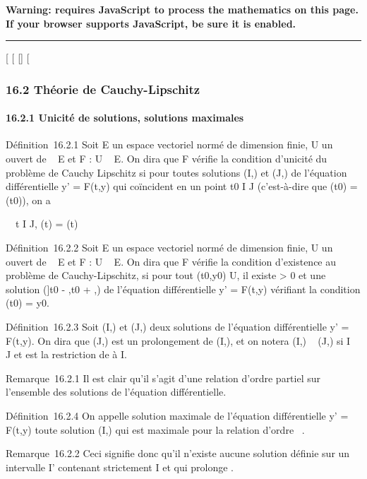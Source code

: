 \textbf{Warning: 
requires JavaScript to process the mathematics on this page.\\ If your
browser supports JavaScript, be sure it is enabled.}

\begin{center}\rule{3in}{0.4pt}\end{center}

{[}
{[}
{[}{]}
{[}

\subsubsection{16.2 Théorie de Cauchy-Lipschitz}

\paragraph{16.2.1 Unicité de solutions, solutions maximales}

Définition~16.2.1 Soit E un espace vectoriel normé de dimension finie, U
un ouvert de ~ \times E et F : U \rightarrow~ E. On dira que F vérifie la condition
d'unicité du problème de Cauchy Lipschitz si pour toutes solutions (I,\phi)
et (J,\psi) de l'équation différentielle y' = F(t,y) qui coïncident en un
point t0 \in I \bigcap J (c'est-à-dire que \phi(t0) =
\psi(t0)), on a

\forall~~t \in I \bigcap J, \phi(t) = \psi(t)

Définition~16.2.2 Soit E un espace vectoriel normé de dimension finie, U
un ouvert de ~ \times E et F : U \rightarrow~ E. On dira que F vérifie la condition
d'existence au problème de Cauchy-Lipschitz, si pour tout
(t0,y0) \in U, il existe \eta \textgreater{} 0 et une
solution ({]}t0 - \eta,t0 + \eta{[},\phi) de l'équation
différentielle y' = F(t,y) vérifiant la condition \phi(t0) =
y0.

Définition~16.2.3 Soit (I,\phi) et (J,\psi) deux solutions de l'équation
différentielle y' = F(t,y). On dira que (J,\psi) est un prolongement de
(I,\phi), et on notera (I,\phi) \prec~ (J,\psi) si I \subset~ J et \phi est la restriction de \psi
à I.

Remarque~16.2.1 Il est clair qu'il s'agit d'une relation d'ordre partiel
sur l'ensemble des solutions de l'équation différentielle.

Définition~16.2.4 On appelle solution maximale de l'équation
différentielle y' = F(t,y) toute solution (I,\phi) qui est maximale pour la
relation d'ordre \prec~.

Remarque~16.2.2 Ceci signifie donc qu'il n'existe aucune solution
définie sur un intervalle I' contenant strictement I et qui prolonge \phi.


